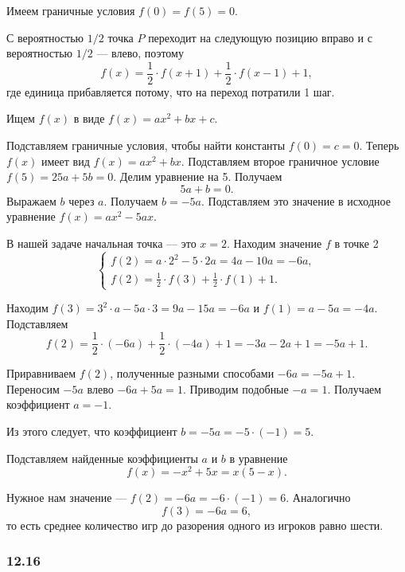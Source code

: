 Имеем граничные условия $f \left( 0 \right) = f \left( 5 \right) = 0$.

С вероятностью $1/2$ точка $P$  переходит на следующую позицию вправо и с вероятностью $1/2$ --- влево, поэтому
$$f \left( x \right) =
\frac{1}{2} \cdot f \left( x+1 \right) + \frac{1}{2} \cdot f \left( x-1 \right) +1,$$
где единица прибавляется потому, что на переход потратили 1 шаг.

Ищем $f \left( x \right) $ в виде $f \left( x \right) = ax^2 + bx + c$.

Подставляем граничные условия, чтобы найти константы $f \left( 0 \right) = c = 0$.
Теперь $f \left( x \right) $ имеет вид $f \left( x \right) = ax^2 + bx$.
Подставляем второе граничное условие $f \left( 5 \right) = 25a + 5b = 0$.
Делим уравнение на 5.
Получаем
$$5a + b =
0.$$
Выражаем $b$ через $a$.
Получаем $b = -5a$.
Подставляем это значение в исходное уравнение $f \left( x \right) = ax^2 - 5ax$.

В нашей задаче начальная точка --- это $x = 2$.
Находим значение $f$ в точке 2
$$ \begin{cases}
f \left( 2 \right) = a \cdot 2^2 - 5 \cdot 2 a = 4a - 10a = -6a, \\
f \left( 2 \right) = \frac{1}{2} \cdot f \left( 3 \right) + \frac{1}{2} \cdot f \left( 1 \right) + 1. 
\end{cases}$$

Находим $f \left( 3 \right) = 3^2 \cdot a - 5 a \cdot 3 = 9a - 15a = -6a$ и $f \left( 1 \right) = a - 5a = -4a$.
Подставляем
$$f \left( 2 \right) =
\frac{1}{2} \cdot \left( -6a \right) + \frac{1}{2} \cdot \left( -4a \right) + 1 =
-3a - 2a + 1 =
-5a + 1.$$

Приравниваем $f \left( 2 \right) $, полученные разными способами $-6a = -5a + 1$.
Переносим $-5a$ влево $-6a + 5a = 1$.
Приводим подобные $-a = 1$.
Получаем коэффициент $a = -1$.

Из этого следует, что коэффициент $b = -5a = -5 \cdot \left( -1 \right) = 5$.

Подставляем найденные коэффициенты $a$ и $b$ в уравнение
$$f \left( x \right) =
-x^2 + 5x =
x \left( 5 - x \right).$$

Нужное нам значение --- $f \left( 2 \right) = -6a = -6 \cdot \left( -1 \right) = 6$.
Аналогично
$$f \left( 3 \right) =
-6a =
6,$$
то есть среднее количество игр до разорения одного из игроков равно шести.

\subsubsection*{12.16}

